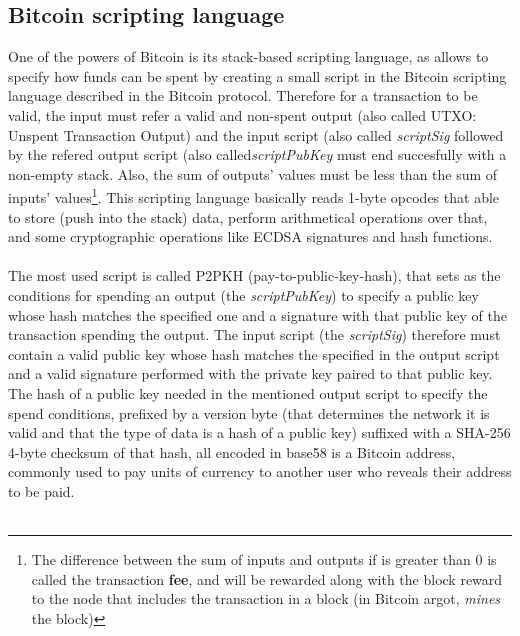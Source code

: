 \documentclass[12pt,journal,compsoc]{IEEEtran}
\begin{document}
\subsection{Bitcoin scripting language}
One of the powers of Bitcoin is its stack-based scripting language, as allows to specify how funds can be spent by creating a small script in the Bitcoin scripting language\cite{bitcoin-wiki-script:online} described in the Bitcoin protocol. Therefore for a transaction to be valid, the input must refer a valid and non-spent output (also called UTXO: Unspent Transaction Output) and the input script (also called \textit{scriptSig} followed by the refered output script (also called\textit{scriptPubKey} must end succesfully with a non-empty stack. Also, the sum of outputs' values must be less than the sum of inputs' values\footnote{The difference between the sum of inputs and outputs if is greater than 0 is called the transaction \textbf{fee}, and will be rewarded along with the block reward to the node that includes the transaction in a block (in Bitcoin argot, \textit{mines} the block)}. This scripting language basically reads 1-byte opcodes that able to store (push into the stack) data, perform arithmetical operations over that, and some cryptographic operations like ECDSA signatures and hash functions. \\\\
The most used script is called P2PKH (pay-to-public-key-hash), that sets as the conditions for spending an output (the \textit{scriptPubKey}) to specify a public key whose hash matches the specified one and a signature with that public key of the transaction spending the output. The input script (the \textit{scriptSig}) therefore must contain a valid public key whose hash matches the specified in the output script and a valid signature performed with the private key paired to that public key. The hash of a public key needed in the mentioned output script to specify the spend conditions, prefixed by a version byte (that determines the network it is valid and that the type of data is a hash of a public key) suffixed with a SHA-256 4-byte checksum of that hash, all encoded in base58 is a Bitcoin address, commonly used to pay units of currency to another user who reveals their address to be paid.\\\\
\end{document}
